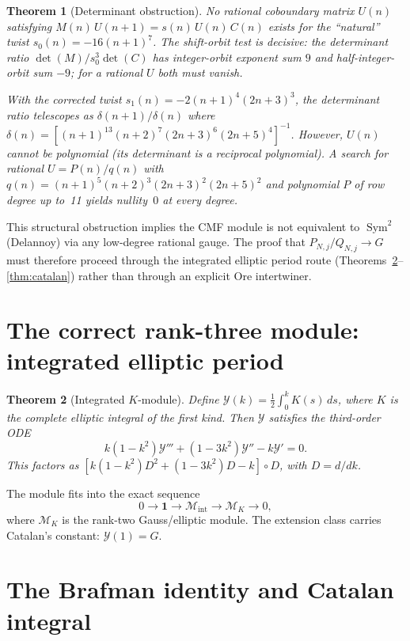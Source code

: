 \documentclass[11pt]{article}
\newtheorem{theorem}{Theorem}
\begin{document}
\begin{theorem}[Determinant obstruction]\label{thm:no-ore}
No rational coboundary matrix $U(n)$ satisfying
$M(n)\,U(n{+}1) = s(n)\,U(n)\,C(n)$ exists for the
``natural'' twist $s_0(n) = -16(n{+}1)^7$.
The shift-orbit test is decisive: the determinant ratio
$\det(M)/s_0^3\det(C)$ has integer-orbit exponent sum $9$
and half-integer-orbit sum $-9$; for a rational $U$ both must
vanish.

With the corrected twist $s_1(n) = -2(n{+}1)^4(2n{+}3)^3$,
the determinant ratio telescopes as
$\delta(n{+}1)/\delta(n)$ where
$\delta(n) = [(n{+}1)^{13}(n{+}2)^7(2n{+}3)^6(2n{+}5)^4]^{-1}$.
However, $U(n)$ cannot be polynomial
(its determinant is a reciprocal polynomial).
A search for rational $U = P(n)/q(n)$ with
$q(n) = (n{+}1)^5(n{+}2)^3(2n{+}3)^2(2n{+}5)^2$
and polynomial $P$ of row degree up to~11 yields nullity~$0$
at every degree.
\end{theorem}

This structural obstruction implies the CMF module is not
equivalent to $\operatorname{Sym}^2$(Delannoy) via any
low-degree rational gauge.
The proof that $P_{N,j}/Q_{N,j} \to G$ must therefore
proceed through the integrated elliptic period route
(Theorems~\ref{thm:intK}--\ref{thm:catalan}) rather than
through an explicit Ore intertwiner.

\section{The correct rank-three module: integrated elliptic period}

\begin{theorem}[Integrated $K$-module]\label{thm:intK}
Define $\mathcal{Y}(k) = \frac{1}{2}\int_0^k K(s)\,ds$,
where $K$ is the complete elliptic integral of the first kind.
Then $\mathcal{Y}$ satisfies the third-order ODE
\begin{equation}\label{eq:intK}
k(1-k^2)\mathcal{Y}''' + (1-3k^2)\mathcal{Y}'' - k\mathcal{Y}' = 0.
\end{equation}
This factors as
$[k(1-k^2)D^2 + (1-3k^2)D - k] \circ D$,
with $D = d/dk$.
\end{theorem}

The module fits into the exact sequence
\[
0 \to \mathbf{1} \to \mathcal{M}_{\mathrm{int}} \to
\mathcal{M}_K \to 0,
\]
where $\mathcal{M}_K$ is the rank-two Gauss/elliptic module.
The extension class carries Catalan's constant:
$\mathcal{Y}(1) = G$.

\section{The Brafman identity and Catalan integral}
\end{document}

